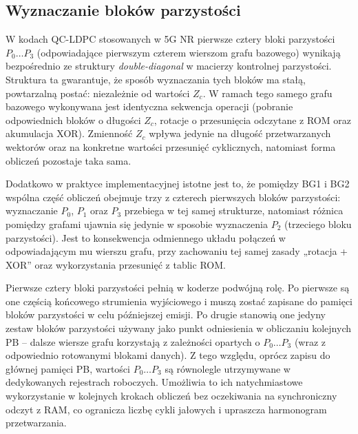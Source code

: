 
\subsection{Wyznaczanie bloków parzystości}
\label{subsec:ldpc_enc_parity_cases}

W kodach QC-LDPC stosowanych w 5G NR pierwsze cztery bloki parzystości $P_0 \ldots P_3$ (odpowiadające pierwszym czterem wierszom grafu bazowego) wynikają bezpośrednio ze struktury \emph{double-diagonal} w macierzy kontrolnej parzystości. Struktura ta gwarantuje, że sposób wyznaczania tych bloków ma stałą, powtarzalną postać: niezależnie od wartości $Z_c$. W ramach tego samego grafu bazowego wykonywana jest identyczna sekwencja operacji (pobranie odpowiednich bloków o długości $Z_c$, rotacje o przesunięcia odczytane z ROM oraz akumulacja XOR). Zmienność $Z_c$ wpływa jedynie na długość przetwarzanych wektorów oraz na konkretne wartości przesunięć cyklicznych, natomiast forma obliczeń pozostaje taka sama.

Dodatkowo w praktyce implementacyjnej istotne jest to, że pomiędzy BG1 i BG2 wspólna część obliczeń obejmuje trzy z czterech pierwszych bloków parzystości: wyznaczanie $P_0$, $P_1$ oraz $P_3$ przebiega w tej samej strukturze, natomiast różnica pomiędzy grafami ujawnia się jedynie w sposobie wyznaczenia $P_2$ (trzeciego bloku parzystości). Jest to konsekwencja odmiennego układu połączeń w odpowiadającym mu wierszu grafu, przy zachowaniu tej samej zasady „rotacja + XOR” oraz wykorzystania przesunięć z tablic ROM.

Pierwsze cztery bloki parzystości pełnią w koderze podwójną rolę. Po pierwsze są one częścią końcowego strumienia wyjściowego i muszą zostać zapisane do pamięci bloków parzystości w celu późniejszej emisji. Po drugie stanowią one jedyny zestaw bloków parzystości używany jako punkt odniesienia w obliczaniu kolejnych PB -- dalsze wiersze grafu korzystają z zależności opartych o $P_0 \ldots P_3$ (wraz z odpowiednio rotowanymi blokami danych). Z tego względu, oprócz zapisu do głównej pamięci PB, wartości $P_0 \ldots P_3$ są równolegle utrzymywane w dedykowanych rejestrach roboczych. Umożliwia to ich natychmiastowe wykorzystanie w kolejnych krokach obliczeń bez oczekiwania na synchroniczny odczyt z RAM, co ogranicza liczbę cykli jałowych i upraszcza harmonogram przetwarzania.





